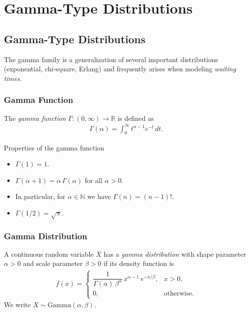 \section{Gamma-Type Distributions}
\subsection{Gamma-Type Distributions}

The gamma family is a generalization of several important distributions (exponential, chi-square, Erlang) and frequently arises when modeling \emph{waiting times}.

\subsubsection{Gamma Function}

\begin{definicion}
The \emph{gamma function} $\Gamma: (0,\infty) \to \mathbb{R}$ is defined as
\begin{align}
 \label{eq:2.8.6}
 \Gamma(\alpha) = \int_0^\infty t^{\alpha-1} e^{-t}\,dt.
\end{align}
\end{definicion}

{Properties of the gamma function}
\begin{itemize}
 \item $\Gamma(1) = 1$.
 \item $\Gamma(\alpha + 1) = \alpha\,\Gamma(\alpha)$ for all $\alpha > 0$.
 \item In particular, for $\alpha \in \mathbb{N}$ we have $\Gamma(n) = (n-1)!$.
 \item $\Gamma(1/2) = \sqrt{\pi}$.
\end{itemize}

\subsubsection{Gamma Distribution}

\begin{definicion}
A continuous random variable $X$ has a \emph{gamma distribution} with shape parameter $\alpha > 0$ and scale parameter $\beta > 0$ if its density function is
\begin{align}
 \label{eq:2.8.7}
 f(x) =
 \begin{cases}
  \dfrac{1}{\Gamma(\alpha)\,\beta^\alpha}\,x^{\alpha-1}\,e^{-x/\beta},
  & x > 0, \\
  0, & \text{otherwise.}
 \end{cases}
\end{align}
We write $X \sim \text{Gamma}(\alpha, \beta)$.
\end{definicion}

